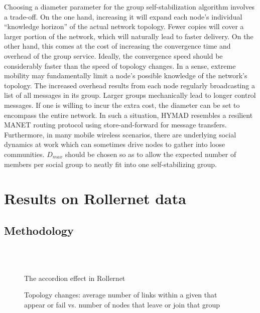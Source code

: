 \documentclass[10pt,twocolumn,letterpaper]{article}
\begin{document}
Choosing a diameter parameter for the group self-stabilization
algorithm involves a trade-off. On the one hand, increasing it will
expand each node's individual ``knowledge horizon'' of the actual
network topology. Fewer copies will cover a larger portion of the
network, which will naturally lead to faster delivery. On the other
hand, this comes at the cost of increasing the convergence time and
overhead of the group service. Ideally, the convergence speed should
be considerably faster than the speed of topology changes. In a sense,
extreme mobility may fundamentally limit a node's possible knowledge
of the network's topology. The increased overhead results from each
node regularly broadcasting a list of all messages in its
group. Larger groups mechanically lead to longer control messages. If
one is willing to incur the extra cost, the diameter can be set to
encompass the entire network. In such a situation, HYMAD resembles a
resilient MANET routing protocol using store-and-forward for message
transfers. Furthermore, in many mobile wireless scenarios, there are
underlying social dynamics at work which can sometimes drive nodes to
gather into loose communities. $D_{max}$ should be chosen so as to
allow the expected number of members per social group to neatly fit
into one self-stabilizing group.

\section{Results on Rollernet data}
\label{results}

\subsection{Methodology}

\begin{figure}[t]
  \centering
   \\
   \\
  \caption{The accordion effect in Rollernet}
  \label{accordeon}
\end{figure}

\begin{figure}[t]
  \centering
  \caption{Topology changes: average number of links within a given
    that appear or fail vs. number of nodes that leave or join that
    group}
  \label{group_stab}
\end{figure}
\end{document}

